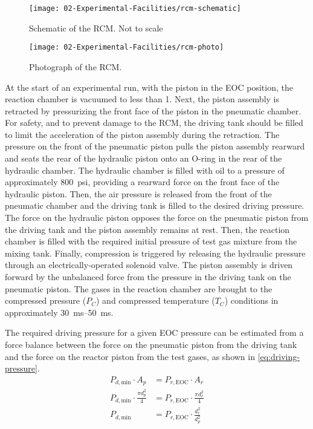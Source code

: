 \documentclass[../main.tex]{subfiles}
\begin{document}
\begin{sidewaysfigure}
\texttt{[image: 02-Experimental-Facilities/rcm-schematic]}
\caption{Schematic of the RCM. Not to scale}
\label{fig:rcm-schematic}
\end{sidewaysfigure}

\begin{figure}
\texttt{[image: 02-Experimental-Facilities/rcm-photo]}
\caption{Photograph of the RCM.}\label{fig:rcm-photo}
\end{figure}

At the start of an experimental run, with the piston in the
EOC position, the reaction chamber is vacuumed to less
than \SI{1}{\torr}. Next, the piston assembly is retracted by pressurizing
the front face of the piston in the pneumatic chamber.
For safety, and to prevent damage to the RCM, the driving tank should
be filled to limit the acceleration of the piston assembly during the
retraction.
The pressure on the front of the pneumatic piston pulls the
piston assembly rearward and seats the rear of the
hydraulic piston onto an O-ring in the rear of the
hydraulic chamber. The hydraulic chamber is filled with oil to
a pressure of approximately \SI{800}{psi}, providing a rearward force on the
front face of the hydraulic piston. Then, the air pressure is released from
the front of the pneumatic chamber and the driving tank is filled to
the desired driving pressure. The
force on the hydraulic piston opposes the force on the pneumatic piston
from the driving tank and the piston assembly remains at rest. Then, the
reaction chamber is filled with the required initial pressure of test
gas mixture from the mixing tank. Finally, compression is triggered by
releasing the hydraulic pressure through an electrically-operated solenoid
valve. The piston assembly is driven forward by the unbalanced force from
the pressure in the driving tank on the pneumatic piston. The gases
in the reaction chamber are brought to the compressed pressure ($P_C$) and
compressed temperature ($T_C$) conditions in approximately
\SIrange{30}{50}{\milli\second}.

The required driving pressure for a given EOC pressure can be estimated
from a force balance between the force on the pneumatic piston from the
driving tank and the force on the reactor piston from the test gases,
as shown in \cref{eq:driving-pressure}.
%
\begin{subequations}
\label{eq:piston-force}
\begin{align}
    P_{d,\text{min}} \cdot A_p &= P_{r,\text{EOC}} \cdot A_r \\
    P_{d,\text{min}} \cdot \frac{\pi d_p^2}{4} &= P_{r,\text{EOC}} \cdot \frac{\pi d_r^2}{4} \\
    P_{d,\text{min}} &= P_{r,\text{EOC}} \cdot \frac{d_r^2}{d_p^2} \label{eq:driving-pressure}
\end{align}
\end{subequations}
\end{document}
